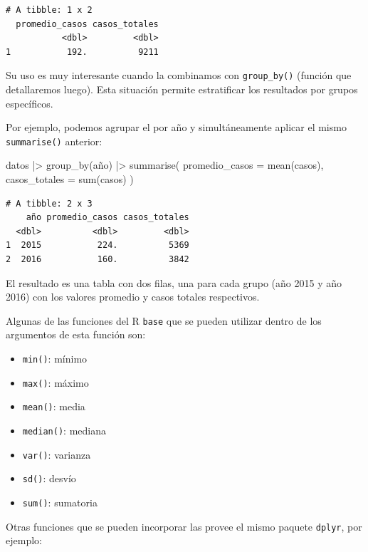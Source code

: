 \documentclass[
  spanish,
  letterpaper,
  DIV=11,
  numbers=noendperiod]{scrreprt}
\newenvironment{Shaded}{\begin{snugshade}}{\end{snugshade}}
\newcommand{\AttributeTok}[1]{\textcolor[rgb]{0.40,0.45,0.13}{#1}}
\newcommand{\FunctionTok}[1]{\textcolor[rgb]{0.28,0.35,0.67}{#1}}
\newcommand{\NormalTok}[1]{\textcolor[rgb]{0.00,0.23,0.31}{#1}}
\newcommand{\SpecialCharTok}[1]{\textcolor[rgb]{0.37,0.37,0.37}{#1}}
\providecommand{\tightlist}{%
  \setlength{\itemsep}{0pt}\setlength{\parskip}{0pt}}
\begin{document}
\begin{verbatim}
# A tibble: 1 x 2
  promedio_casos casos_totales
           <dbl>         <dbl>
1           192.          9211
\end{verbatim}

Su uso es muy interesante cuando la combinamos con \texttt{group\_by()}
(función que detallaremos luego). Esta situación permite estratificar
los resultados por grupos específicos.

Por ejemplo, podemos agrupar el por año y simultáneamente aplicar el
mismo \texttt{summarise()} anterior:

\begin{Shaded}
\begin{Highlighting}[]
\NormalTok{datos }\SpecialCharTok{|\textgreater{}}
  \FunctionTok{group\_by}\NormalTok{(año) }\SpecialCharTok{|\textgreater{}}
  \FunctionTok{summarise}\NormalTok{(}
    \AttributeTok{promedio\_casos =} \FunctionTok{mean}\NormalTok{(casos),}
    \AttributeTok{casos\_totales =} \FunctionTok{sum}\NormalTok{(casos)}
\NormalTok{  )}
\end{Highlighting}
\end{Shaded}

\begin{verbatim}
# A tibble: 2 x 3
    año promedio_casos casos_totales
  <dbl>          <dbl>         <dbl>
1  2015           224.          5369
2  2016           160.          3842
\end{verbatim}

El resultado es una tabla con dos filas, una para cada grupo (año 2015 y
año 2016) con los valores promedio y casos totales respectivos.

Algunas de las funciones del R \texttt{base} que se pueden utilizar
dentro de los argumentos de esta función son:

\begin{itemize}
\tightlist
\item
  \texttt{min()}: mínimo
\item
  \texttt{max()}: máximo
\item
  \texttt{mean()}: media
\item
  \texttt{median()}: mediana
\item
  \texttt{var()}: varianza
\item
  \texttt{sd()}: desvío
\item
  \texttt{sum()}: sumatoria
\end{itemize}

Otras funciones que se pueden incorporar las provee el mismo paquete
\texttt{dplyr}, por ejemplo:
\end{document}

